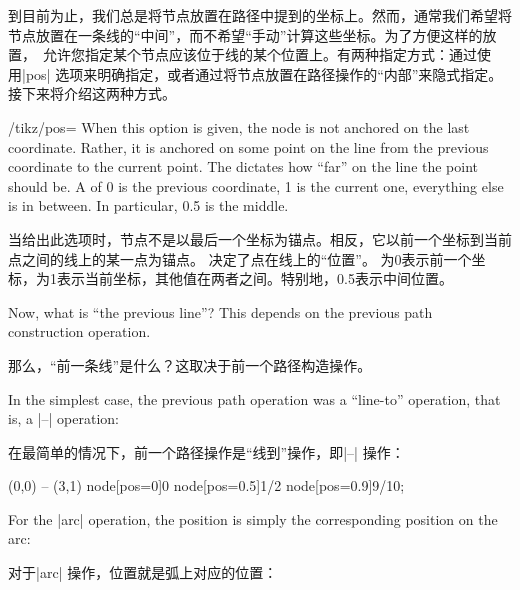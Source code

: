 到目前为止，我们总是将节点放置在路径中提到的坐标上。然而，通常我们希望将节点放置在一条线的“中间”，而不希望“手动”计算这些坐标。为了方便这样的放置，\tikzname\ 允许您指定某个节点应该位于线的某个位置上。有两种指定方式：通过使用|pos| 选项来明确指定，或者通过将节点放置在路径操作的“内部”来隐式指定。接下来将介绍这两种方式。

    \label{section-pos-option}

\begin{key}{/tikz/pos=}
    When this option is given, the node is not anchored on the last coordinate.
    Rather, it is anchored on some point on the line from the previous
    coordinate to the current point. The  dictates how ``far''
    on the line the point should be. A  of 0 is the previous
    coordinate, 1 is the current one, everything else is in between. In
    particular, 0.5 is the middle.

    当给出此选项时，节点不是以最后一个坐标为锚点。相反，它以前一个坐标到当前点之间的线上的某一点为锚点。 决定了点在线上的“位置”。 为0表示前一个坐标，为1表示当前坐标，其他值在两者之间。特别地，0.5表示中间位置。



    Now, what is ``the previous line''? This depends on the previous path
    construction operation.

    那么，“前一条线”是什么？这取决于前一个路径构造操作。

    In the simplest case, the previous path operation was a ``line-to''
    operation, that is, a |--| operation:

    在最简单的情况下，前一个路径操作是“线到”操作，即|--| 操作：
\begin{codeexample}[]
\tikz \draw (0,0) -- (3,1)
    node[pos=0]{0} node[pos=0.5]{1/2} node[pos=0.9]{9/10};
\end{codeexample}

    For the |arc| operation, the position is simply the corresponding position
    on the arc:
    
    对于|arc| 操作，位置就是弧上对应的位置：

\begin{codeexample}[]
\end{codeexample}


\end{key}
